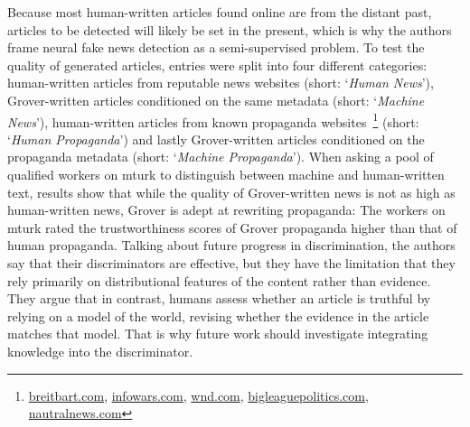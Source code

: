 Because most human-written articles found online are from the distant past, articles to be detected will likely be set in the present, which is why the authors frame neural fake news detection as a semi-supervised problem. To test the quality of generated articles, entries were split into four different categories: human-written articles from reputable news websites (short: `\textit{Human News}'), Grover-written articles conditioned on the same metadata (short: `\textit{Machine News}'), human-written articles from known propaganda websites~\footnote{\url{breitbart.com}, \url{infowars.com}, \url{wnd.com}, \url{bigleaguepolitics.com}, \url{nautralnews.com}} (short: `\textit{Human Propaganda}') and lastly Grover-written articles conditioned on the propaganda metadata (short: `\textit{Machine Propaganda}'). When asking a pool of qualified workers on \gls{mturk} to distinguish between machine and human-written text, results show that while the quality of Grover-written news is not as high as human-written news, Grover is adept at rewriting propaganda: The workers on \gls{mturk} rated the trustworthiness scores of Grover propaganda higher than that of human propaganda. Talking about future progress in discrimination, the authors say that their discriminators are effective, but they have the limitation that they rely primarily on distributional features of the content rather than evidence. They argue that in contrast, humans assess whether an article is truthful by relying on a model of the world, revising whether the evidence in the article matches that model. That is why future work should investigate integrating knowledge into the discriminator.
